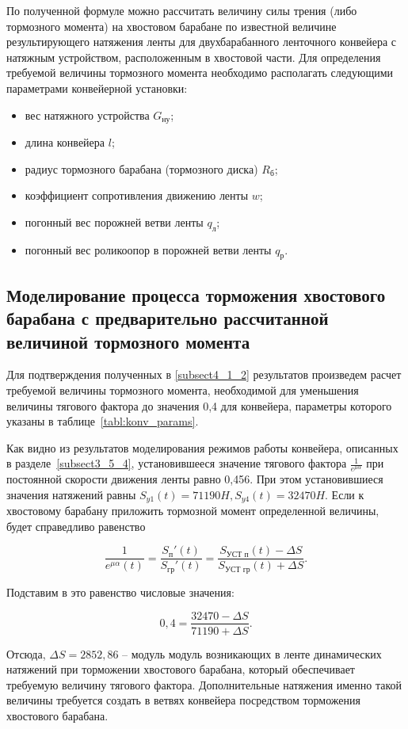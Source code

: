 По полученной формуле можно рассчитать величину силы трения (либо тормозного момента) на хвостовом барабане по известной величине результирующего натяжения ленты для двухбарабанного ленточного конвейера с натяжным устройством, расположенным в хвостовой части. Для определения требуемой величины тормозного момента необходимо располагать следующими параметрами конвейерной установки:
\begin{itemize}
\item вес натяжного устройства $ G_{\text{ну}} $;
\item длина конвейера $ l $;
\item радиус тормозного барабана (тормозного диска) $ R_{\text{б}} $;
\item коэффициент сопротивления движению ленты $ w $;
\item погонный вес порожней ветви ленты $ q_{\text{л}} $;
\item погонный вес роликоопор в порожней ветви ленты $ q_{\text{р}} $.\\
\end{itemize}

\subsection{Моделирование процесса торможения хвостового барабана с предварительно рассчитанной величиной тормозного момента} \label{subsect4_1_3}
Для подтверждения полученных в \ref{subsect4_1_2} результатов произведем расчет требуемой величины тормозного момента, необходимой для уменьшения величины тягового фактора до значения 0,4 для конвейера, параметры которого указаны в таблице~\ref{tabl:konv_params}.

Как видно из результатов моделирования режимов работы конвейера, описанных в разделе~\ref{subsect3_5_4}, установившееся значение тягового фактора $ \frac{1}{e^{\mu\alpha}} $ при постоянной скорости движения ленты равно 0,456. При этом установившиеся значения натяжений равны $ S_{y1}(t) = 71190H, S_{y4}(t) = 32470H. $ Если к хвостовому барабану приложить тормозной момент определенной величины, будет справедливо равенство

$$ \frac{1}{e^{\mu\alpha}(t)} = \frac{S_\text{п}'(t)}{S_\text{гр}'(t)} = \frac{S_{\text{УСТ п}}(t) - \Delta S}{S_{\text{УСТ гр}}(t) + \Delta S}. $$

Подставим в это равенство числовые значения:

$$ 0,4 = \frac{32470 - \Delta S}{71190 + \Delta S}. $$

Отсюда, $ \Delta S = 2852,86 $ -- модуль модуль возникающих в ленте динамических натяжений при торможении хвостового барабана, который обеспечивает требуемую величину тягового фактора. Дополнительные натяжения именно такой величины требуется создать в ветвях конвейера посредством торможения хвостового барабана.

